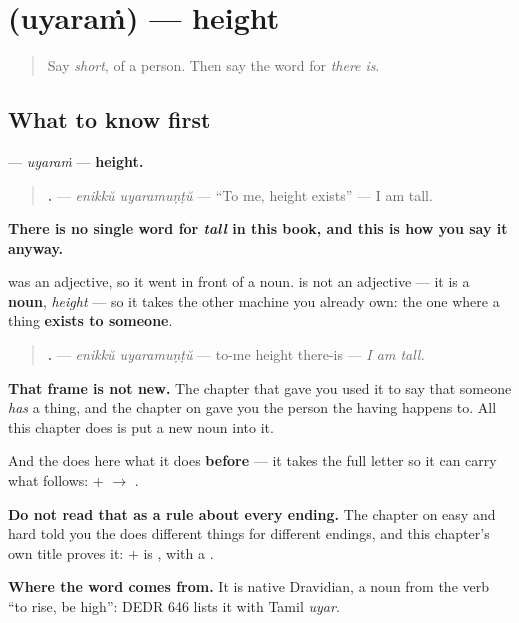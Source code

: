 \section[\texorpdfstring{\ml{ഉയരം} (uyaraṁ)}{ഉയരം (uyaraṁ)}]{ (uyaraṁ) — height}

\label{lesson:ML-C101-uyaram}



\begin{quote}
Say \emph{short}, of a person. Then say the word for \emph{there is}.
\end{quote}

\subsection*{What to know first}
\textbf{} — \emph{uyaraṁ} — \textbf{height.}

\begin{quote}
\textbf{ .} — \emph{enikkŭ uyaramuṇṭŭ} — \textquotedblleft{}To me, height exists\textquotedblright{} — I am tall.
\end{quote}

\begin{cousinweb}
\textbf{There is no single word for \emph{tall} in this book, and this is how you say it anyway.}

\textbf{} was an adjective, so it went in front of a noun. \textbf{} is not an adjective — it is a \textbf{noun}, \emph{height} — so it takes the other machine you already own: the one where a thing \textbf{exists to someone}.

\begin{quote}
\textbf{ .} — \emph{enikkŭ uyaramuṇṭŭ} — to-me height there-is — \emph{I am tall.}
\end{quote}

\textbf{That frame is not new.} The chapter that gave you \textbf{} used it to say that someone \emph{has} a thing, and the chapter on \textbf{} gave you the person the having happens to. All this chapter does is put a new noun into it.

And the \textbf{} does here what it does \textbf{before } — it takes the full letter \textbf{} so it can carry what follows: \textbf{} + \textbf{} $\to$ \textbf{}.

\textbf{Do not read that as a rule about every ending.} The chapter on easy and hard told you the \textbf{} does different things for different endings, and this chapter's own title proves it: \textbf{} + \textbf{} is \textbf{}, with a \textbf{}.

\textbf{Where the word comes from.} It is native Dravidian, a noun from the verb \textquotedblleft{}to rise, be high\textquotedblright{}: DEDR 646 lists it with Tamil \emph{uyar}.
\end{cousinweb}

